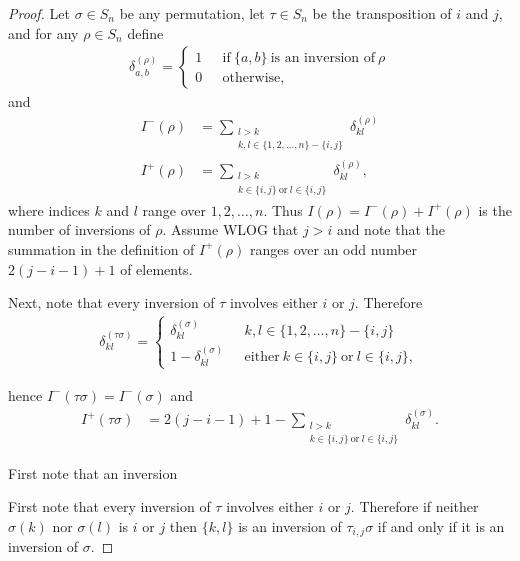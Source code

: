 \begin{proof}
  Let $\sigma \in S_n$ be any permutation, let $\tau \in S_n$ be the transposition of $i$ and $j$, and for
  any $\rho \in S_n$ define
  \begin{align*}
    \delta^{(\rho)}_{a,b} =
    \begin{cases}
      1 &~~~\text{if}~\{a, b\}~\text{is an inversion of}~\rho\\
      0 &~~~\text{otherwise},
    \end{cases}
  \end{align*}
  and
  \begin{align*}
    I^-(\rho) &=  \sum_{\substack{l > k\\k, l \in \{1, 2, \ldots, n\} - \{i, j\}}}\delta^{(\rho)}_{kl}\\
    I^+(\rho) &=  \sum_{\substack{l > k\\k \in \{i, j\} ~\text{or}~ l \in \{i, j\}}}\delta^{(\rho)}_{kl},
  \end{align*}
  where indices $k$ and $l$ range over $1, 2, \ldots, n$. Thus $I(\rho) = I^-(\rho) + I^+(\rho)$ is the number of
  inversions of $\rho$. Assume WLOG that $j > i$ and note that the summation in the definition
  of $I^+(\rho)$ ranges over an odd number $2(j - i -1) + 1$ of elements.

  Next, note that every inversion of $\tau$ involves either $i$ or $j$. Therefore
  \begin{align*}
    \delta^{(\tau\sigma)}_{kl} =
    \begin{cases}
      \delta^{(\sigma)}_{kl} &~~~k, l \in \{1, 2, \ldots, n\} - \{i, j\}\\
      1 - \delta^{(\sigma)}_{kl} &~~~\text{either}~k \in \{i, j\} ~\text{or}~ l \in \{i, j\},
    \end{cases}
  \end{align*}

  hence $I^-(\tau\sigma) = I^-(\sigma)$ and
  \begin{align*}
    I^+(\tau\sigma) &= 2(j - i -1) + 1 -  \sum_{\substack{l > k\\k \in \{i, j\} ~\text{or}~ l \in \{i, j\}}}\delta^{(\sigma)}_{kl}.
  \end{align*}





  First note that an inversion

  First note that every inversion of $\tau$ involves either $i$ or $j$. Therefore if
  neither $\sigma(k)$ nor $\sigma(l)$ is $i$ or $j$ then $\{k, l\}$ is an inversion of
  $\tau_{i,j}\sigma$ if and only if it is an inversion of $\sigma$.


\end{proof}
